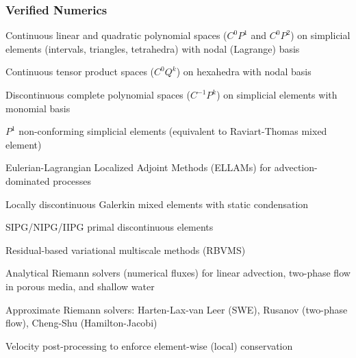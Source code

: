 \documentclass{beamer}
\begin{document}
\begin{frame}
\frametitle{Verified Numerics}
\bit
\footnotesize
\item Continuous linear and quadratic polynomial spaces ($C^0 P^1$ and $C^0 P^2$) on simplicial elements (intervals, triangles, tetrahedra) with nodal (Lagrange) basis
\item Continuous tensor product spaces ($C^0 Q^k$) on hexahedra with nodal basis
\item Discontinuous complete polynomial spaces ($C^{-1} P^k$) on simplicial elements with monomial basis
\item $P^1$ non-conforming simplicial elements (equivalent to Raviart-Thomas mixed element)
\item Eulerian-Lagrangian Localized Adjoint Methods (ELLAMs) for advection-dominated processes 
\item Locally discontinuous Galerkin mixed elements with static condensation
\item SIPG/NIPG/IIPG primal discontinuous elements
\item Residual-based variational multiscale methods (RBVMS)
\item Analytical Riemann solvers (numerical fluxes) for linear advection, two-phase flow in porous media, and shallow water
\item Approximate Riemann solvers: Harten-Lax-van Leer (SWE), Rusanov (two-phase flow), Cheng-Shu (Hamilton-Jacobi)
\item Velocity post-processing to enforce element-wise (local) conservation
\eit
\end{frame}
\end{document}

